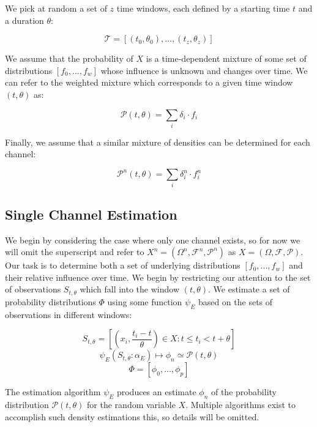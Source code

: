 \documentclass[10pt]{article}
\begin{document}
We pick at random a set of \( z \) time windows, each defined by a starting time \( t \) and a duration \( \theta \):

\[  \mathcal{T} = [(t_0,\theta_0),...,(t_z,\theta_z) ] \]

We assume that the probability of \(X \) is a time-dependent mixture of some set of distributions \( [f_0,...,f_w] \) whose influence is unknown and changes over time.  We can refer to the weighted mixture which corresponds to a given time window \( (t,\theta) \) as:

\begin{equation} \mathcal{P}(t,\theta) = \sum_i \delta_i \cdot f_i \end{equation}

Finally, we assume that a similar mixture of densities can be determined for each channel:

\begin{equation} \mathcal{P}^n(t,\theta) = \sum_i \delta_i^n \cdot f_i^n \end{equation}

\subsection{Single Channel Estimation}
We begin by considering the case where only one channel exists, so for now we will omit the superscript and refer to \(X^n = (\Omega^n,\mathcal{F}^n,\mathcal{P}^n) \) as \(X = (\Omega, \mathcal{F},\mathcal{P}) \).  Our task is to determine both a set of underlying distributions \([f_0,...,f_w] \) and their relative influence over time.  We begin by restricting our attention to the set of observations \( S_{t,\theta} \) which fall into the window \( (t,\theta) \).  We estimate a set of probability distributions \(\Phi \) using some function \(\psi_E \) based on the sets of observations in different windows:

\begin{equation} S_{t,\theta} = \left[ \left( x_i,\frac{t_i - t}{\theta} \right) \in X : t \le t_i < t+\theta \right] \end{equation}
\begin{equation} \psi_E( S_{t,\theta}:\alpha_E ) \mapsto \phi_n \simeq \mathcal{P}(t,\theta)  \end{equation}
\[ \Phi = [\phi_0,...,\phi_p ] \nonumber \]

The estimation algorithm \(\psi_{E} \) produces an estimate \(\phi_n \) of the probability distribution \( \mathcal{P}(t,\theta) \) for the random variable \( X \).  Multiple algorithms exist to accomplish such density estimations this, so details will be omitted.
\end{document}
